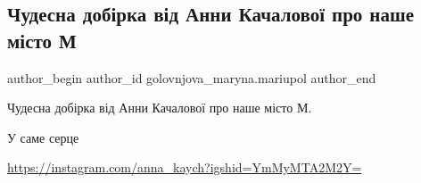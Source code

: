  
 
 
 
 

\subsection{Чудесна добірка від Анни Качалової про наше місто М}
\label{sec:02_05_2022.fb.golovnjova_maryna.mariupol.1.chudesna_dob_rka_v_d}

\ifcmt
 author_begin
   author_id golovnjova_maryna.mariupol
 author_end
\fi

Чудесна добірка від Анни Качалової про наше місто М.

У саме серце💙

\url{https://instagram.com/anna_kaych?igshid=YmMyMTA2M2Y=}
